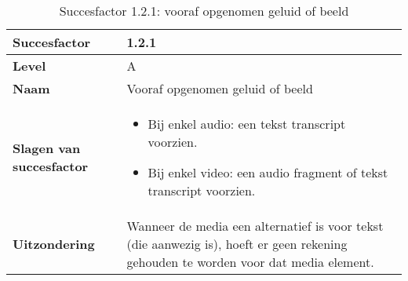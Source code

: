 \begin{table}[H]
    \centering
    \caption{Succesfactor 1.2.1: vooraf opgenomen geluid of beeld}
    \hspace*{-1cm}\begin{tabular}{|l|p{12cm}|} 
        \hline
        \textbf{Succesfactor}                & 1.2.1                                                                                                                                                                                                                                                                                                             \\ 
        \hline
        \textbf{Level}                       & A                                                                                                                                                                                                                                                                                                                                                                             \\ 
        \hline
        \textbf{Naam}                        & Vooraf opgenomen geluid of beeld~                                                                                                                                                                                                                                                                                                                                                            \\ 
        \hline
        \textbf{Slagen van succesfactor}     & \begin{itemize}
            \item Bij enkel audio: een tekst transcript voorzien.
            \item Bij enkel video: een audio fragment of tekst transcript voorzien.
        \end{itemize}                                                                                                                                                                                                      \\ 
     \hline
    \textbf{Uitzondering}     & 
        Wanneer de media een alternatief is voor tekst (die aanwezig is), hoeft er geen rekening gehouden te worden voor dat media element.                                                                                                                                                                                                     \\ 

\end{tabular}
\end{table}
